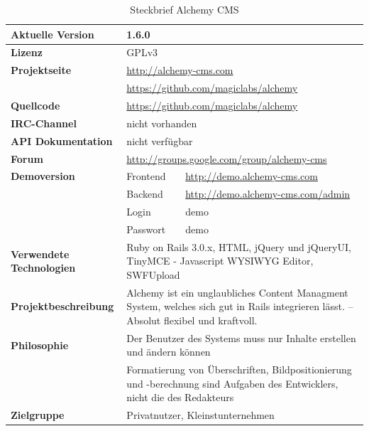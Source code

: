 \begin{table}[!h]
\caption{Steckbrief Alchemy CMS}
\begin{tabular}[!ht]{|l|l|l|}
\hline
\textbf{Aktuelle Version} & \multicolumn{2}{p{10cm}|}{1.6.0} \\
\hline
\textbf{Lizenz} & \multicolumn{2}{p{10cm}|}{GPLv3} \\
\hline
\textbf{Projektseite} & \multicolumn{2}{p{10cm}|}{\href{http://alchemy-cms.com}{http://alchemy-cms.com}} \\
 & \multicolumn{2}{p{10cm}|}{\href{https://github.com/magiclabs/alchemy}{https://github.com/magiclabs/alchemy}} \\
\hline
\textbf{Quellcode} & \multicolumn{2}{p{10cm}|}{\href{https://github.com/magiclabs/alchemy}{https://github.com/magiclabs/alchemy}} \\
\hline
\textbf{IRC-Channel} & \multicolumn{2}{p{10cm}|}{nicht vorhanden} \\
\hline
\textbf{API Dokumentation} & \multicolumn{2}{p{10cm}|}{nicht verfügbar} \\
\hline
\textbf{Forum} & \multicolumn{2}{p{10cm}|}{\href{http://groups.google.com/group/alchemy-cms}{http://groups.google.com/group/alchemy-cms}} \\
\hline
\textbf{Demoversion} & Frontend & \href{http://demo.alchemy-cms.com}{http://demo.alchemy-cms.com} \\
\cline{2-3}
& Backend & \href{http://demo.alchemy-cms.com/admin}{http://demo.alchemy-cms.com/admin} \\
\cline{2-3}
& Login & demo \\
\cline{2-3}
& Passwort & demo \\
\hline
\textbf{Verwendete Technologien} & \multicolumn{2}{p{10cm}|}{Ruby on Rails 3.0.x, HTML, jQuery und jQueryUI, TinyMCE - Javascript WYSIWYG Editor, SWFUpload} \\
\hline
\textbf{Projektbeschreibung} & \multicolumn{2}{p{10cm}|}{Alchemy ist ein unglaubliches Content Managment System, welches sich gut in Rails integrieren lässt. – Absolut flexibel und kraftvoll.} \\
\hline
\textbf{Philosophie} & \multicolumn{2}{p{10cm}|}{Der Benutzer des Systems muss nur Inhalte erstellen und ändern können} \\
& \multicolumn{2}{p{10cm}|}{Formatierung von Überschriften, Bildpositionierung und -berechnung sind Aufgaben des Entwicklers, nicht die des Redakteurs}\\
\hline
\textbf{Zielgruppe} & \multicolumn{2}{p{10cm}|}{Privatnutzer, Kleinstunternehmen} \\
\hline
\end{tabular}
\end{table}

